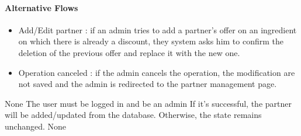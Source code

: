 {  \paragraph{Alternative Flows}
  \begin{itemize}
    \item Add/Edit partner : if an admin tries to add a partner's offer on an ingredient on which there is already a discount, they system asks him to confirm the deletion of the previous offer and replace it with the new one.
    \item Operation canceled : if the admin cancels the operation, the modification are not saved and the admin is redirected to the partner management page.
  \end{itemize}
}
{None}
{The user must be logged in and be an admin}
{If it’s successful, the partner will be added/updated from the database. Otherwise, the state remains unchanged.}
{None}